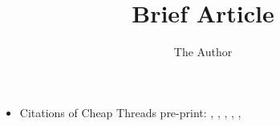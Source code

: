 \documentclass[11pt]{article}
\title{Brief Article}
\author{The Author}
\begin{document}
\maketitle

\begin{itemize}
\item Citations of Cheap Threads pre-print: 
\cite{Abadi2014}, 
\cite{Marlow:2014:NFA:2628136.2628144},
\cite{Mehnert2014},
\cite{Pallari2015},
\cite{DBLP:journals/corr/abs-1202-2922},
\cite{nott10779}





\end{itemize}





\end{document}
